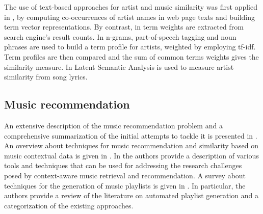 The use of text-based approaches for artist and music similarity was first applied in \citep{Cohen2000}, by computing co-occurrences of artist names in web page texts and building term vector representations. By contrast, in \citep{Schedl2005} term weights are extracted from search engine's result counts. In \citep{Whitman2002} n-grams, part-of-speech tagging and noun phrases are used to build a term profile for artists, weighted by employing tf-idf. Term profiles are then compared and the sum of common terms weights gives the similarity measure. %
In \citep{Logan2003} Latent Semantic Analysis is used to measure artist similarity from song lyrics. %


\subsection{Music recommendation}
\label{sec:SOA:mir:music-recommendation}

An extensive description of the music recommendation problem and a comprehensive summarization of the initial attempts to tackle it is presented in \citep{oscarBook}. An overview about techniques for music recommendation and similarity based on music contextual data is given in \citep{Knees2013}. 
In \citep{KaminskasR12} the authors provide a description of various tools and techniques that can be used for addressing the research
challenges posed by context-aware music retrieval and recommendation. 
A survey about techniques for the generation of music playlists is given in \citep{Bonnin2014}. In particular, the authors provide a review of the literature on automated playlist generation and a categorization of the existing approaches. 

